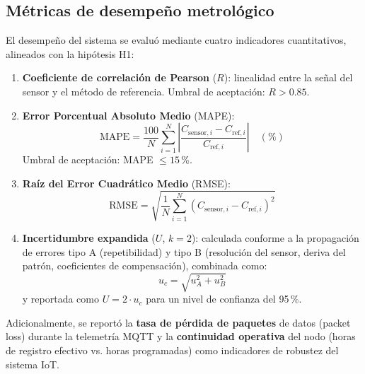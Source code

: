 \subsection{Métricas de desempeño metrológico}
\label{subsec:cap2_metricas}

El desempeño del sistema se evaluó mediante cuatro indicadores
cuantitativos, alineados con la hipótesis H1:

\begin{enumerate}
    \item \textbf{Coeficiente de correlación de Pearson} ($R$):
    linealidad entre la señal del sensor y el método de referencia.
    Umbral de aceptación: $R > 0.85$.
    
    \item \textbf{Error Porcentual Absoluto Medio} (MAPE):
    \begin{equation}
\text{MAPE} = \frac{100}{N} \sum_{i=1}^{N} \left| \frac{C_{\text{sensor},i} - C_{\text{ref},i}}{C_{\text{ref},i}} \right| \quad (\%)
        \label{eq:mape}
    \end{equation}
    Umbral de aceptación: MAPE $\leq 15$\,\%.
    
    \item \textbf{Raíz del Error Cuadrático Medio} (RMSE):
    \begin{equation}
        \text{RMSE} = \sqrt{\frac{1}{N} \sum_{i=1}^{N} (C_{\text{sensor},i} - C_{\text{ref},i})^2}
        \label{eq:rmse}
    \end{equation}
    
    \item \textbf{Incertidumbre expandida} ($U$, $k=2$):
    calculada conforme a la propagación de errores tipo A (repetibilidad)
    y tipo B (resolución del sensor, deriva del patrón, coeficientes de
    compensación), combinada como:
    \begin{equation}
        u_c = \sqrt{u_A^2 + u_B^2}
        \label{eq:incertidumbre_combinada}
    \end{equation}
    y reportada como $U = 2 \cdot u_c$ para un nivel de confianza del
    95\,\%.
\end{enumerate}

Adicionalmente, se reportó la \textbf{tasa de pérdida de paquetes}
de datos (packet loss) durante la telemetría MQTT y la
\textbf{continuidad operativa} del nodo (horas de registro efectivo
vs. horas programadas) como indicadores de robustez del sistema IoT.